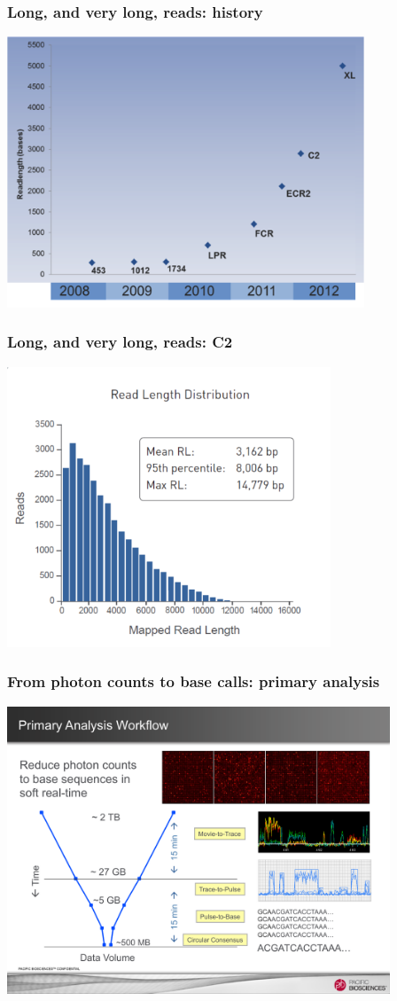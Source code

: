 \documentclass[serif,11pt]{beamer}
\begin{document}
\begin{frame}
\frametitle{Long, and very long, reads: history}
\label{sec-3-2}

   \includegraphics[width=4.2in]{img/readlength-timeline.png}
\end{frame}
\begin{frame}
\frametitle{Long, and very long, reads: C2}
\label{sec-3-3}

   \includegraphics[width=3.8in]{img/c2-readlengths.pdf}
\end{frame}
\begin{frame}
\frametitle{From photon counts to base calls: \textbf{primary} analysis}
\label{sec-3-4}

   \includegraphics[width=4.5in]{img/primary-reduction.pdf}
\end{frame}
\end{document}
